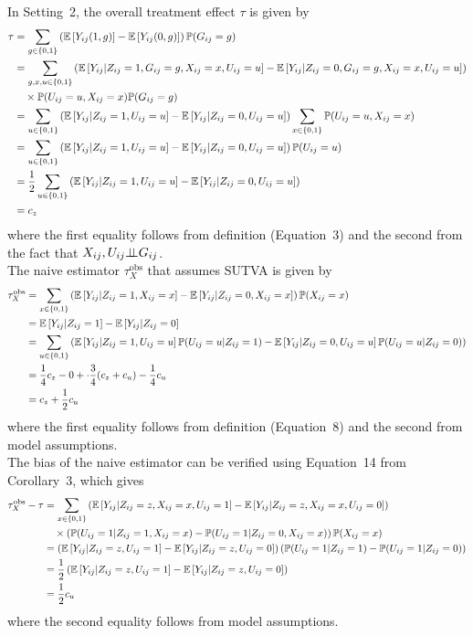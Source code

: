 \documentclass[10pt]{article}
\begin{document}
In Setting~2, the overall treatment effect $\tau$ is given by
\begin{align*}
\tau &= \sum_{g\in\{0,1\}} \left(\mathbb{E}\left[Y_{ij}(1,g)\right] - \mathbb{E}\left[Y_{ij}(0,g)\right]\right)\mathbb{P}(G_{ij}=g) \\
&= \sum_{g,x,u\in\{0,1\}} \left(\mathbb{E}\left[Y_{ij}|Z_{ij}=1,G_{ij}=g,X_{ij}=x,U_{ij}=u\right] - \mathbb{E}\left[Y_{ij}|Z_{ij}=0,G_{ij}=g,X_{ij}=x,U_{ij}=u\right]\right) \\
&\quad \times \mathbb{P}(U_{ij}=u,X_{ij}=x)\mathbb{P}(G_{ij}=g) \\
&= \sum_{u\in\{0,1\}} \left(\mathbb{E}\left[Y_{ij}|Z_{ij}=1,U_{ij}=u\right] - \mathbb{E}\left[Y_{ij}|Z_{ij}=0,U_{ij}=u\right]\right) \sum_{x\in\{0,1\}}\mathbb{P}(U_{ij}=u,X_{ij}=x) \\
&= \sum_{u\in\{0,1\}} \left(\mathbb{E}\left[Y_{ij}|Z_{ij}=1,U_{ij}=u\right] - \mathbb{E}\left[Y_{ij}|Z_{ij}=0,U_{ij}=u\right]\right)\mathbb{P}(U_{ij}=u) \\
&= \frac{1}{2}\sum_{u\in\{0,1\}} \left(\mathbb{E}\left[Y_{ij}|Z_{ij}=1,U_{ij}=u\right] - \mathbb{E}\left[Y_{ij}|Z_{ij}=0,U_{ij}=u\right]\right) \\
&= c_z
\end{align*}
where the first equality follows from definition (Equation~3) and the second from the fact that $X_{ij},U_{ij}{\perp\!\!\!\perp} G_{ij}$.
\\

The naive estimator $\tau_{X}^\text{obs}$ that assumes SUTVA is given by
\begin{align*}
\tau_{X}^\text{obs} &= \sum_{x\in\{0,1\}}\left(\mathbb{E}\left[Y_{ij}|Z_{ij}=1,X_{ij}=x\right] - \mathbb{E}\left[Y_{ij}|Z_{ij}=0,X_{ij}=x\right]\right)\mathbb{P}(X_{ij}=x) \\
&= \mathbb{E}\left[Y_{ij}|Z_{ij}=1\right] - \mathbb{E}\left[Y_{ij}|Z_{ij}=0\right] \\
&= \sum_{u\in\{0,1\}}\left(\mathbb{E}\left[Y_{ij}|Z_{ij}=1,U_{ij}=u\right]\mathbb{P}(U_{ij}=u|Z_{ij}=1)  - \mathbb{E}\left[Y_{ij}|Z_{ij}=0,U_{ij}=u\right]\mathbb{P}(U_{ij}=u|Z_{ij}=0)\right) \\
&= \frac{1}{4}c_z - 0 + \cdot\frac{3}{4}(c_z+c_u) - \frac{1}{4}c_u \\
&= c_z + \frac{1}{2}c_u
\end{align*}
where the first equality follows from definition (Equation~8) and the second from model assumptions.
\\

The bias of the naive estimator can be verified using Equation~14 from Corollary~3, which gives
\begin{align*}
\tau_{X}^\text{obs} - \tau &= \sum_{x\in\{0,1\}}\left(\mathbb{E}\left[Y_{ij}|Z_{ij}=z,X_{ij}=x,U_{ij}=1\right]-\mathbb{E}\left[Y_{ij}|Z_{ij}=z,X_{ij}=x,U_{ij}=0\right]\right) \\
&\quad \times\left(\mathbb{P}(U_{ij}=1|Z_{ij}=1,X_{ij}=x)-\mathbb{P}(U_{ij}=1|Z_{ij}=0,X_{ij}=x)\right)\mathbb{P}(X_{ij}=x) \\
&= \left(\mathbb{E}\left[Y_{ij}|Z_{ij}=z,U_{ij}=1\right]-\mathbb{E}\left[Y_{ij}|Z_{ij}=z,U_{ij}=0\right]\right)\left(\mathbb{P}(U_{ij}=1|Z_{ij}=1)-\mathbb{P}(U_{ij}=1|Z_{ij}=0)\right) \\
&= \frac{1}{2}\left(\mathbb{E}\left[Y_{ij}|Z_{ij}=z,U_{ij}=1\right]-\mathbb{E}\left[Y_{ij}|Z_{ij}=z,U_{ij}=0\right]\right) \\
&=\frac{1}{2}c_u
\end{align*}
where the second equality follows from model assumptions.
\end{document}

